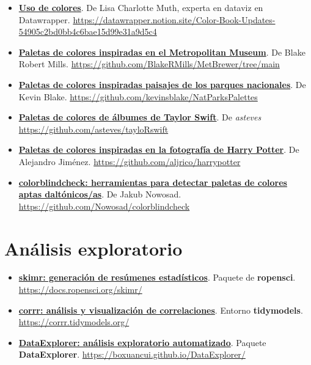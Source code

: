\documentclass[11pt,]{book}
\begin{document}
\begin{itemize}
\item
  \href{https://datawrapper.notion.site/Color-Book-Updates-54905c2bd0bb4c6bae15d99e31a9d5c4}{\textbf{Uso de colores}}. De Lisa Charlotte Muth, experta en dataviz en Datawrapper. \url{https://datawrapper.notion.site/Color-Book-Updates-54905c2bd0bb4c6bae15d99e31a9d5c4}
\item
  \href{https://github.com/BlakeRMills/MetBrewer/tree/main}{\textbf{Paletas de colores inspiradas en el Metropolitan Museum}}. De Blake Robert Mills. \url{https://github.com/BlakeRMills/MetBrewer/tree/main}
\item
  \href{https://github.com/kevinsblake/NatParksPalettes}{\textbf{Paletas de colores inspiradas paisajes de los parques nacionales}}. De Kevin Blake. \url{https://github.com/kevinsblake/NatParksPalettes}
\item
  \href{https://github.com/asteves/tayloRswift}{\textbf{Paletas de colores de álbumes de Taylor Swift}}. De \emph{asteves} \url{https://github.com/asteves/tayloRswift}
\item
  \href{https://github.com/aljrico/harrypotter}{\textbf{Paletas de colores inspiradas en la fotografía de Harry Potter}}. De Alejandro Jiménez. \url{https://github.com/aljrico/harrypotter}
\item
  \href{https://github.com/Nowosad/colorblindcheck}{\textbf{colorblindcheck: herramientas para detectar paletas de colores aptas daltónicos/as}}. De Jakub Nowosad. \url{https://github.com/Nowosad/colorblindcheck}
\end{itemize}

\hypertarget{anuxe1lisis-exploratorio}{%
\section*{Análisis exploratorio}\label{anuxe1lisis-exploratorio}}


\begin{itemize}
\item
  \href{https://docs.ropensci.org/skimr/}{\textbf{skimr: generación de resúmenes estadísticos}}. Paquete de \textbf{ropensci}. \url{https://docs.ropensci.org/skimr/}
\item
  \href{https://corrr.tidymodels.org/}{\textbf{corrr: análisis y visualización de correlaciones}}. Entorno \textbf{tidymodels}. \url{https://corrr.tidymodels.org/}
\item
  \href{https://boxuancui.github.io/DataExplorer/}{\textbf{DataExplorer: análisis exploratorio automatizado}}. Paquete \textbf{DataExplorer}. \url{https://boxuancui.github.io/DataExplorer/}
\end{itemize}
\end{document}
